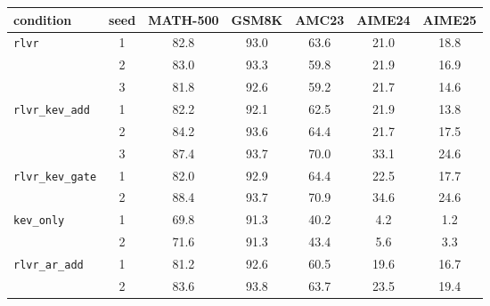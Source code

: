 \begin{tabular}{@{}lcccccc@{}}
\toprule
condition & seed & MATH-500 & GSM8K & AMC23 & AIME24 & AIME25 \\ \midrule
\texttt{rlvr} & 1 & 82.8 & 93.0 & 63.6 & 21.0 & 18.8 \\
 & 2 & 83.0 & 93.3 & 59.8 & 21.9 & 16.9 \\
 & 3 & 81.8 & 92.6 & 59.2 & 21.7 & 14.6 \\
\addlinespace
\texttt{rlvr\_kev\_add} & 1 & 82.2 & 92.1 & 62.5 & 21.9 & 13.8 \\
 & 2 & 84.2 & 93.6 & 64.4 & 21.7 & 17.5 \\
 & 3 & 87.4 & 93.7 & 70.0 & 33.1 & 24.6 \\
\addlinespace
\texttt{rlvr\_kev\_gate} & 1 & 82.0 & 92.9 & 64.4 & 22.5 & 17.7 \\
 & 2 & 88.4 & 93.7 & 70.9 & 34.6 & 24.6 \\
\addlinespace
\texttt{kev\_only} & 1 & 69.8 & 91.3 & 40.2 & 4.2 & 1.2 \\
 & 2 & 71.6 & 91.3 & 43.4 & 5.6 & 3.3 \\
\addlinespace
\texttt{rlvr\_ar\_add} & 1 & 81.2 & 92.6 & 60.5 & 19.6 & 16.7 \\
 & 2 & 83.6 & 93.8 & 63.7 & 23.5 & 19.4 \\
\bottomrule
\end{tabular}

